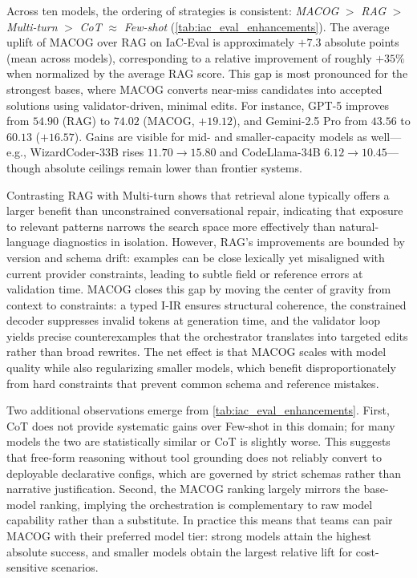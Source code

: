 \documentclass[manuscript,screen,nonacm]{acmart}
\begin{document}
Across ten models, the ordering of strategies is consistent: \emph{MACOG} \(>\) \emph{RAG} \(>\) \emph{Multi-turn} \(>\) \emph{CoT} \(\approx\) \emph{Few-shot} (\autoref{tab:iac_eval_enhancements}). The average uplift of MACOG over RAG on IaC-Eval is approximately \(+7.3\) absolute points (mean across models), corresponding to a relative improvement of roughly \(+35\%\) when normalized by the average RAG score. This gap is most pronounced for the strongest bases, where MACOG converts near-miss candidates into accepted solutions using validator-driven, minimal edits. For instance, GPT-5 improves from \(54.90\) (RAG) to \(74.02\) (MACOG, \(+19.12\)), and Gemini-2.5 Pro from \(43.56\) to \(60.13\) (\(+16.57\)). Gains are visible for mid- and smaller-capacity models as well—e.g., WizardCoder-33B rises \(11.70 \rightarrow 15.80\) and CodeLlama-34B \(6.12 \rightarrow 10.45\)—though absolute ceilings remain lower than frontier systems.

Contrasting RAG with Multi-turn shows that retrieval alone typically offers a larger benefit than unconstrained conversational repair, indicating that exposure to relevant patterns narrows the search space more effectively than natural-language diagnostics in isolation. However, RAG’s improvements are bounded by version and schema drift: examples can be close lexically yet misaligned with current provider constraints, leading to subtle field or reference errors at validation time. MACOG closes this gap by moving the center of gravity from context to constraints: a typed I-IR ensures structural coherence, the constrained decoder suppresses invalid tokens at generation time, and the validator loop yields precise counterexamples that the orchestrator translates into targeted edits rather than broad rewrites. The net effect is that MACOG scales with model quality while also regularizing smaller models, which benefit disproportionately from hard constraints that prevent common schema and reference mistakes.

Two additional observations emerge from \autoref{tab:iac_eval_enhancements}. First, CoT does not provide systematic gains over Few-shot in this domain; for many models the two are statistically similar or CoT is slightly worse. This suggests that free-form reasoning without tool grounding does not reliably convert to deployable declarative configs, which are governed by strict schemas rather than narrative justification. Second, the MACOG ranking largely mirrors the base-model ranking, implying the orchestration is complementary to raw model capability rather than a substitute. In practice this means that teams can pair MACOG with their preferred model tier: strong models attain the highest absolute success, and smaller models obtain the largest relative lift for cost-sensitive scenarios.
\end{document}
